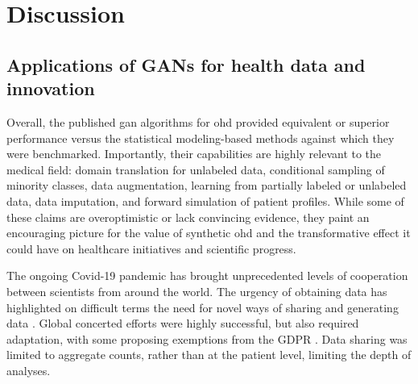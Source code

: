 \section{Discussion}


\subsection{Applications of GANs for health data and innovation}

Overall, the published \gls{gan} algorithms for \gls{ohd} provided equivalent or superior performance versus the statistical modeling-based methods against which they were benchmarked. Importantly, their capabilities are highly relevant to the medical field: domain translation for unlabeled data, conditional sampling of minority classes, data augmentation, learning from partially labeled or unlabeled data, data imputation, and forward simulation of patient profiles. While some of these claims are overoptimistic or lack convincing evidence, they paint an encouraging picture for the value of synthetic \gls{ohd} and the transformative effect it could have on healthcare initiatives and scientific progress.\par

The ongoing Covid-19 pandemic has brought unprecedented levels of cooperation between scientists from around the world. The urgency of obtaining data has highlighted on difficult terms the need for novel ways of sharing and generating data \cite{bandara_improving_2020, Cosgriff_2020}. Global concerted efforts were highly successful, but also required adaptation, with some proposing exemptions from the GDPR \cite{mclennan_covid-19_2020}. Data sharing was limited to aggregate counts, rather than at the patient level, limiting the depth of analyses. \par

